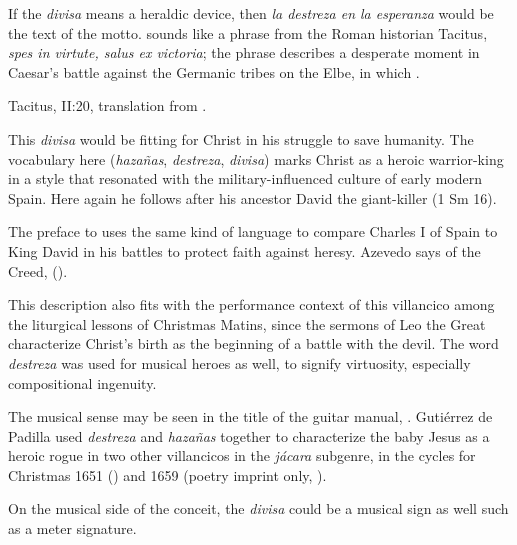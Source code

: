 If the \emph{divisa} means a heraldic device, then \emph{la destreza en la
esperanza} would be the text of the motto.
 sounds like a phrase from the Roman historian
Tacitus, \emph{spes in virtute, salus ex victoria}; the phrase describes a
desperate moment in Caesar's battle against the Germanic tribes on the Elbe, in
which .%
\begin{Footnote}
    Tacitus,  II:20, translation from
    \autocite[49]{Tacitus:Annales-English}.
\end{Footnote}
This \emph{divisa} would be fitting for Christ in his struggle to save humanity.
The vocabulary here (\emph{hazañas}, \emph{destreza}, \emph{divisa}) marks
Christ as a heroic warrior-king in a style that resonated with the
military-influenced culture of early modern Spain. 
Here again he follows after his ancestor David the giant-killer (1 Sm 16).%
\begin{Footnote}
    The preface to \autocite{Azevedo:Catecismo} uses the same kind of language
    to compare Charles I of Spain to King David in his battles to protect faith
    against heresy. 
    Azevedo says of the Creed,  ().
\end{Footnote}
This description also fits with the performance context of this villancico among
the liturgical lessons of Christmas Matins, since the sermons of Leo the Great
characterize Christ's birth as the beginning of a battle with the devil.
The word \emph{destreza} was used for musical heroes as well, to signify
virtuosity, especially compositional ingenuity.%
\begin{Footnote}
    \Autocite
    [: ]
    {Covarrubias:Tesoro}
    The musical sense may be seen in the title of the guitar manual,
    \autocite{Sanz:Guitarra}.
    Gutiérrez de Padilla used \emph{destreza} and \emph{hazañas} together to
    characterize the baby Jesus as a heroic rogue in two other villancicos in
    the \emph{jácara} subgenre, in the cycles for Christmas 1651
    () and 1659 (poetry imprint only,
    ).
\end{Footnote}
On the musical side of the conceit, the \emph{divisa} could be a musical sign as
well such as a meter signature.

